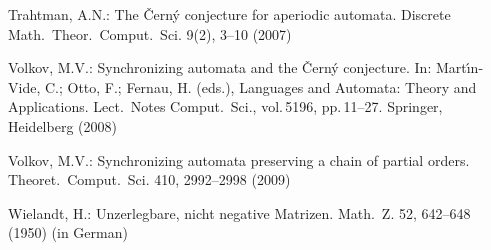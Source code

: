 \documentclass[12pt,twoside]{article}
\begin{document}
\begin{thebibliography}{99}
Trahtman, A.N.: The \v{C}ern\'y conjecture for aperiodic automata. Discrete
Math.\ Theor.\ Comput.\ Sci. 9(2), 3--10 (2007)

Volkov, M.V.: Synchronizing automata and the \v{C}ern\'{y}
conjecture. In: Mart\'\i{}n-Vide, C.; Otto, F.; Fernau, H. (eds.),
Languages and Automata: Theory and Applications. Lect.\ Notes
Comput.\ Sci., vol.\,5196, pp.\,11--27.  Springer, Heidelberg (2008)

Volkov, M.V.: Synchronizing automata preserving a chain of partial
orders. Theoret.\ Comput.\ Sci. 410, 2992--2998 (2009)

Wielandt, H.: Unzerlegbare, nicht negative Matrizen. Math.\ Z.
52, 642--648 (1950) (in German)
\end{thebibliography}
\end{document}
